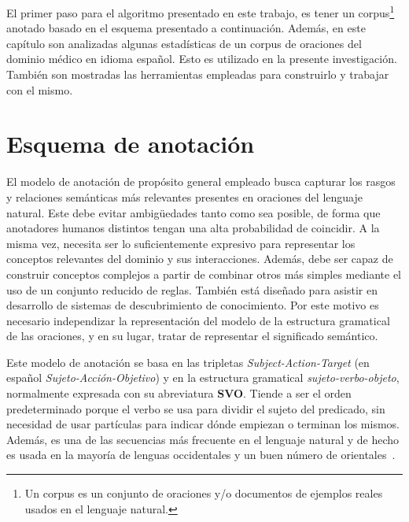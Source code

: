 \label{chapter:annotation_model}
El primer paso para el algoritmo presentado en este trabajo, es tener un corpus\footnote{Un corpus es un conjunto de oraciones y/o documentos de ejemplos reales usados en el lenguaje natural.} anotado basado en el esquema presentado a continuación. Además, en este capítulo son analizadas algunas estadísticas de un corpus de oraciones del dominio médico en idioma español. Esto es utilizado en la presente investigación. También son mostradas las herramientas empleadas para construirlo y trabajar con el mismo.

\section{Esquema de anotación}
\label{section:annotation_structure}
El modelo de anotación de propósito general empleado busca capturar los rasgos y relaciones semánticas más relevantes presentes en oraciones del lenguaje natural. Este debe evitar ambigüedades tanto como sea posible, de forma que anotadores humanos distintos tengan una alta probabilidad de coincidir. A la misma vez, necesita ser lo suficientemente expresivo para representar los conceptos relevantes del dominio y sus interacciones. Además, debe ser capaz de construir conceptos complejos a partir de combinar otros más simples mediante el uso de un conjunto reducido de reglas. También está diseñado para asistir en desarrollo de sistemas de descubrimiento de conocimiento. Por este motivo es necesario independizar la representación del modelo de la estructura gramatical de las oraciones, y en su lugar, tratar de representar el significado semántico.

Este modelo de anotación se basa en las tripletas \textit{Subject-Action-Target} (en español \textit{Sujeto-Acción-Objetivo}) y en la estructura gramatical \textit{sujeto-verbo-objeto}, normalmente expresada con su abreviatura \textbf{SVO}. Tiende a ser el orden predeterminado porque el verbo se usa para dividir el sujeto del predicado, sin necesidad de usar partículas para indicar dónde empiezan o terminan los mismos. Además, es una de las secuencias más frecuente en el lenguaje natural y de hecho es usada en la mayoría de lenguas occidentales y un buen número de orientales~\cite{ref:83}.


